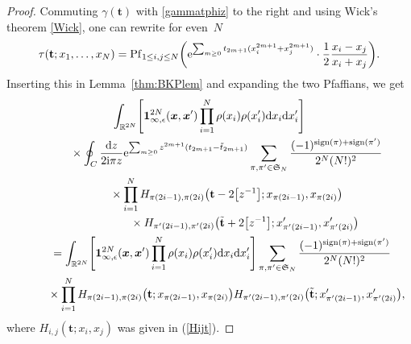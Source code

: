 \documentclass[pdftex]{sigma}
\numberwithin{equation}{section}
\newcommand{\dd}{\mathrm{d}}
\begin{document}
\begin{proof}
Commuting $\gamma(\mathbf{t})$ with \eqref{gammatphiz} to the right and using
Wick's theorem \eqref{Wick}, one can rewrite for even~$N$
\[
\tau(\mathbf{t};x_1,\dots,x_N) = \operatorname{Pf}_{1 \leq i,j \leq N} \biggl({\rm e}^{\sum_{m \geq 0} t_{2m + 1}(x_i^{2m + 1} + x_j^{2m + 1})}\cdot \frac{1}{2} \frac{x_i - x_j}{x_i + x_j}\biggr).
\]
Inserting this in Lemma~\ref{thm:BKPlem} and expanding the two Pfaffians, we get
\begin{gather}
 \int_{\mathbb{R}^{2N}} \Biggl[ \mathbf{1}_{\infty,\epsilon}^{2N}(\boldsymbol{x},\boldsymbol{x}') \prod_{i = 1}^{N} \rho(x_i)\rho(x_i')\dd x_i \dd x_i' \Biggr] \nonumber
 \\
 \qquad\quad{} \times \oint_C\frac{\dd z}{2{\rm i}\pi z} {\rm e}^{\sum_{m \geq 0} z^{2m+1}(t_{2m+1}-\tilde{t}_{2m+1})}
 \sum_{\pi,\pi'\in \mathfrak{S}_N}
 \frac{ (-1)^{\mathrm{sign}(\pi)+\mathrm{sign}(\pi')}}{
 2^{N}(N!)^2} \nonumber
\\
\qquad \quad{} \times \prod_{i=1}^N H_{\pi(2i-1),\pi(2i)}\bigl(\mathbf{t}
-2\bigl[z^{-1}\bigr];x_{\pi(2i-1)},x_{\pi(2i)}\bigr) \nonumber
\\ \qquad \qquad{} \hphantom{\times \prod_{i=1}^N}{}
\times H_{\pi'(2i-1),\pi'(2i)}\bigl(\tilde{\mathbf{t}}+2\bigl[z^{-1}\bigr];
x'_{\pi'(2i-1)},x'_{\pi'(2i)}\bigr) \nonumber
\\
\qquad{} =
\int_{\mathbb{R}^{2N}}
 \Biggl[ \mathbf{1}_{\infty,\epsilon}^{2N}(\boldsymbol{x},\boldsymbol{x}') \prod_{i = 1}^{N} \rho(x_i)\rho(x_i')\dd x_i \dd x_i' \Biggr]
 \sum_{\pi,\pi'\in \mathfrak{S}_N}
 \frac{ (-1)^{\mathrm{sign}(\pi)+\mathrm{sign}(\pi')}}{
 2^{N}(N!)^2} \nonumber
\\
\qquad\quad{} \times \prod_{i=1}^N H_{\pi(2i-1),\pi(2i)}\bigl(\mathbf{t};x_{\pi(2i-1)},x_{\pi(2i)}\bigr)
 H_{\pi'(2i-1),\pi'(2i)}\bigl(\tilde{\mathbf{t}};x'_{\pi'(2i-1)},x'_{\pi'(2i)}\bigr),\label{expanH}
\end{gather}
where $H_{i,j}(\mathbf{t};x_i,x_j)$ was given in (\ref{Hijt}).


\end{proof}
\end{document}
